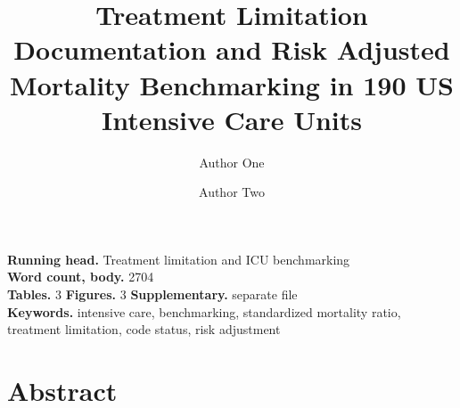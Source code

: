 \documentclass[12pt,a4paper]{article}
\title{\textbf{Treatment Limitation Documentation and Risk Adjusted Mortality
Benchmarking in 190 US Intensive Care Units}}
\author[1]{Author One}
\author[1]{Author Two}
\affil[1]{Affiliation to be completed}
\date{}
\begin{document}
\maketitle

\noindent\textbf{Running head.} Treatment limitation and ICU benchmarking\\
\textbf{Word count, body.} 2704\\
\textbf{Tables.} 3 \quad \textbf{Figures.} 3 \quad \textbf{Supplementary.} separate file\\
\textbf{Keywords.} intensive care, benchmarking, standardized mortality ratio,
treatment limitation, code status, risk adjustment

\newpage
\section*{Abstract}
\end{document}
